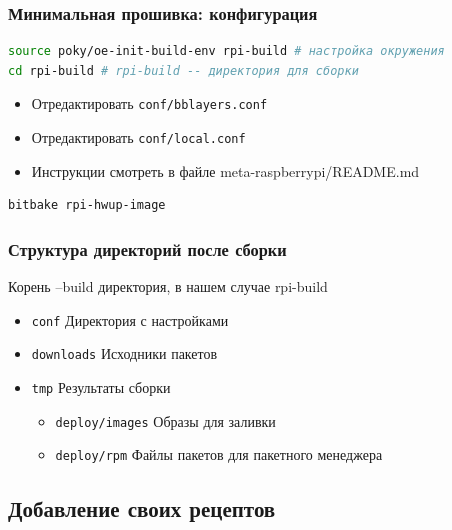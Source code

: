 \begin{frame}[fragile]
   \frametitle{Минимальная прошивка: конфигурация}
\begin{lstlisting}[language=bash]
source poky/oe-init-build-env rpi-build # настройка окружения
cd rpi-build # rpi-build -- директория для сборки
\end{lstlisting}
  \begin{itemize}
    \item Отредактировать \texttt{conf/bblayers.conf}
    \item Отредактировать \texttt{conf/local.conf}
    \item Инструкции смотреть в файле meta-raspberrypi/README.md
  \end{itemize}
\begin{lstlisting}[language=bash]
bitbake rpi-hwup-image
\end{lstlisting}
\end{frame}

\begin{frame}
  \frametitle{Структура директорий после сборки}
  Корень --build директория, в нашем случае rpi-build
  \begin{itemize}
    \item \texttt{conf} Директория с настройками
    \item \texttt{downloads} Исходники пакетов
    \item \texttt{tmp} Результаты сборки
    \begin{itemize}
       \item \texttt{deploy/images} Образы для заливки
       \item \texttt{deploy/rpm} Файлы пакетов для пакетного менеджера
    \end{itemize}
  \end{itemize}
\end{frame}

\subsection{Добавление своих рецептов}

